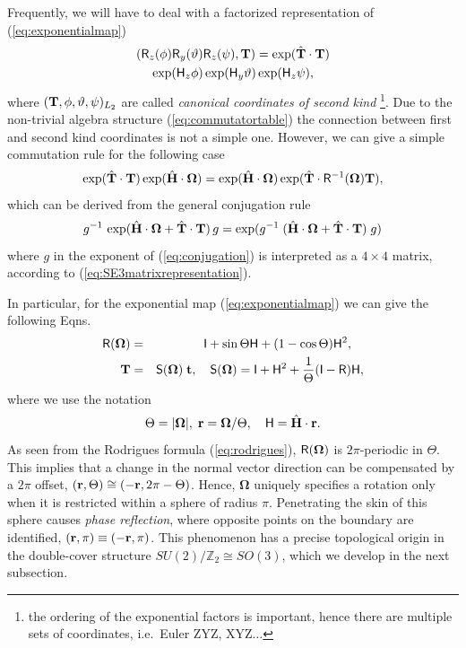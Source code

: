 \documentclass[conference]{IEEEtran}
\newcommand{\bfOmega}{\boldsymbol{\Omega}}
\newcommand{\beq}{\begin{equation}}
\newcommand{\eeq}{\end{equation}}
\newcommand{\beqar}{\begin{eqnarray}}
\newcommand{\eeqar}{\end{eqnarray}}
\begin{document}
\begin{appendix}
Frequently, we will have to deal with a factorized representation of (\ref{eq:exponentialmap})
\begin{multline}
    ( {\sf R}_z(\phi){\sf R}_y(\vartheta){\sf R}_z(\psi),{\bf T}) = \exp( \hat{\bf T}\cdot {\bf T} ) \\
    \exp( {\sf H}_z\phi)\exp( {\sf H}_y\vartheta)\exp( {\sf H}_z\psi),
    \label{eq:Lie2ndkind}
\end{multline}
where $({\bf T},\phi,\vartheta,\psi)_{L_2}$ are called {\em canonical coordinates of second kind}
\footnote{the ordering of the exponential factors is important, hence there are multiple sets
of coordinates, i.e.\ Euler ZYZ, XYZ$\ldots$}.
Due to the non-trivial algebra structure (\ref{eq:commutatortable}) the connection between first
and second kind coordinates is not a simple one.
However, we can give a simple commutation rule for the following case
\beq
    \exp(\hat{\bf T}\cdot{\bf T})\exp(\hat{\bf H}\cdot\bfOmega) =
    \exp(\hat{\bf H}\cdot\bfOmega)\exp(\hat{\bf T}\cdot{\sf R}^{-1}(\bfOmega){\bf T}),
    \label{eq:TOmegacommute}
\eeq
which can be derived from the general conjugation rule
\beq
    g^{-1}\,\exp(\hat{\bf H}\cdot\bfOmega+\hat{\bf T}\cdot{\bf T})\, g =
    \exp(g^{-1}\; (\hat{\bf H}\cdot\bfOmega+\hat{\bf T}\cdot{\bf T})\; g) \label{eq:conjugation}
\eeq
where $g$ in the exponent of (\ref{eq:conjugation}) is interpreted as a $4\times 4$ matrix, according to
(\ref{eq:SE3matrixrepresentation}).

In particular, for the exponential map (\ref{eq:exponentialmap}) we can give the following
Eqns.~
\beqar
    {\sf R}(\bfOmega) &=& {\sf I}+\sin\Theta {\sf H} + (1-\cos\Theta){\sf H}^2,
    \quad \label{eq:rodrigues} \\
    {\bf T} &=& {\sf S}(\bfOmega)\; {\bf t},\quad
    {\sf S}(\bfOmega) = {\sf I} + {\sf H}^2 +  {1\over\Theta}({\sf I}-{\sf R}){\sf H}, \nonumber
\eeqar
where we use the notation
\beq
    \Theta=|\bfOmega|,\; {\bf r} = \bfOmega/\Theta,\quad
    {\sf H}=\hat{\bf H}\cdot{\bf r}. \label{eq:expnotation}
\eeq
As seen from the Rodrigues formula (\ref{eq:rodrigues}), ${\sf R}(\bfOmega)$ is $2\pi$-periodic in $\Theta$.
This implies that a change in the normal vector direction can be compensated by a $2\pi$ offset,
$({\bf r},\Theta) \cong (-{\bf r},2\pi-\Theta)$. Hence, $\bfOmega$ uniquely specifies a rotation
only when it is restricted within a sphere of radius $\pi$. Penetrating the skin of this sphere
causes {\em phase reflection}, where opposite points on the boundary are identified,
$({\bf r},\pi) \equiv (-{\bf r},\pi)$.
This phenomenon has a precise topological origin in the double-cover structure
$SU(2)/\mathbb{Z}_2 \cong SO(3)$, which we develop in the next subsection.


\end{appendix}
\end{document}
